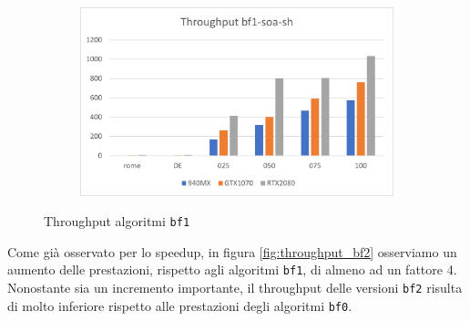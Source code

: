 \documentclass[12pt,a4paper,oneside]{book}
\begin{document}
\begin{figure}[b]
\begin{subfigure}{.5\textwidth}
		\end{subfigure}%
		\begin{subfigure}{.5\textwidth}
			\centering
			\includegraphics[width=\textwidth]{throughput_bf1-soa-sh}
		\end{subfigure}
		\caption{Throughput algoritmi \texttt{bf1}}
		\label{fig:throughput_bf1}
	\end{figure}

	Come già osservato per lo speedup, in figura \ref{fig:throughput_bf2} osserviamo un aumento delle prestazioni, rispetto agli algoritmi \texttt{bf1}, di almeno ad un fattore 4. Nonostante sia un incremento importante, il throughput delle versioni \texttt{bf2} risulta di molto inferiore rispetto alle prestazioni degli algoritmi \texttt{bf0}.
\end{document}
